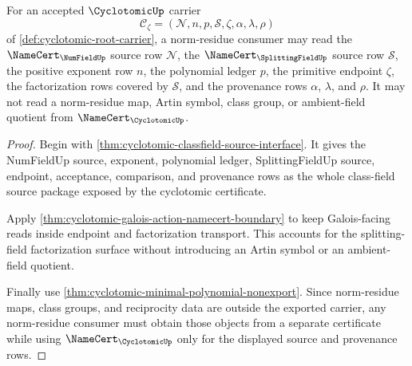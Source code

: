 \begin{theorem}
\label{thm:cyclotomic-norm-residue-boundary}
For an accepted $\CyclotomicUp$ carrier
$$
\mathcal{C}_{\zeta}=(\mathcal{N},n,p,\mathcal{S},\zeta,\alpha,\lambda,\rho)
$$
of \autoref{def:cyclotomic-root-carrier}, a norm-residue consumer may read the $\NameCert_{\NumFieldUp}$ source row $\mathcal{N}$, the $\NameCert_{\SplittingFieldUp}$ source row $\mathcal{S}$, the positive exponent row $n$, the polynomial ledger $p$, the primitive endpoint $\zeta$, the factorization rows covered by $\mathcal{S}$, and the provenance rows $\alpha$, $\lambda$, and $\rho$. It may not read a norm-residue map, Artin symbol, class group, or ambient-field quotient from $\NameCert_{\CyclotomicUp}$.
\end{theorem}
\begin{proof}
Begin with \autoref{thm:cyclotomic-classfield-source-interface}. It gives the NumFieldUp source, exponent, polynomial ledger, SplittingFieldUp source, endpoint, acceptance, comparison, and provenance rows as the whole class-field source package exposed by the cyclotomic certificate.

Apply \autoref{thm:cyclotomic-galois-action-namecert-boundary} to keep Galois-facing reads inside endpoint and factorization transport. This accounts for the splitting-field factorization surface without introducing an Artin symbol or an ambient-field quotient.

Finally use \autoref{thm:cyclotomic-minimal-polynomial-nonexport}. Since norm-residue maps, class groups, and reciprocity data are outside the exported carrier, any norm-residue consumer must obtain those objects from a separate certificate while using $\NameCert_{\CyclotomicUp}$ only for the displayed source and provenance rows.
\end{proof}

